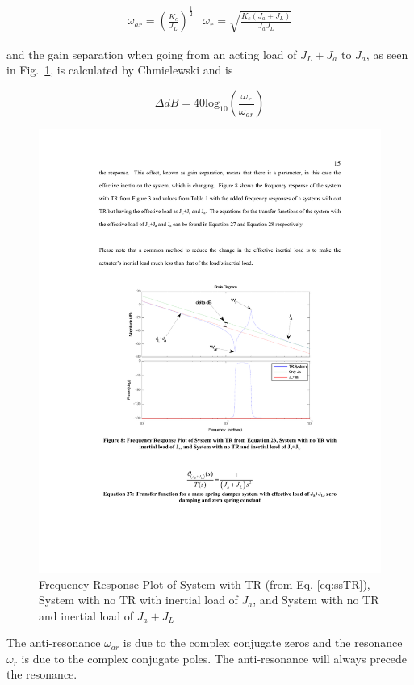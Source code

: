 \begin{equation}\label{eq:res}
\begin{array}{cc}

\omega_{ar} = \left(\frac{K_c}{J_L}\right)^\frac{1}{2}

&

\omega_{r} = \sqrt{\frac{K_c(J_a+J_L)}{J_aJ_L}}
\end{array}
\end{equation}

\noindent and the gain separation when going from an acting load of $J_L+J_a$ to $J_a$, as seen in Fig.~\ref{fig:trBode}, is calculated by Chmielewski \cite{chmGainSep} and is

\begin{equation}\label{eq:deltaDB}
\Delta dB = 40\mbox{log}_{10}\left(\frac{\omega_r}{\omega_{ar}}\right)
\end{equation}


\begin{figure}[ht]
  \centering
\includegraphics[width=1.0\columnwidth]{./pix/bode.pdf}
  \caption{Frequency Response Plot of System with TR (from Eq. \ref{eq:ssTR}), System with no TR with
inertial load of $J_a$, and System with no TR and inertial load of $J_a+J_L$}
  \label{fig:trBode}
\end{figure}

The anti-resonance $\omega_{ar}$ is due to the complex conjugate zeros and the resonance $\omega_r$ is due to the complex conjugate poles.  The anti-resonance will always precede the resonance.